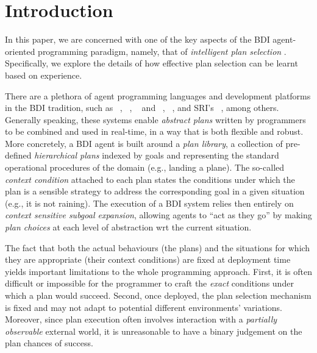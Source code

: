\section{Introduction}\label{sec:intro}

In this paper, we are concerned with one of the key aspects of the BDI
agent-oriented programming paradigm, namely, that of \emph{intelligent plan
selection} \cite{Pollack92-IRMA,Georgeff89-PRS}.
Specifically, we explore the details of how effective plan selection can be
learnt based on experience.


There are a plethora of agent programming languages and development platforms in
the BDI tradition, such as  \PRS\ \cite{Georgeff89-PRS}, \JACK~\cite{BRHL98},
\TAPL~\cite{Hindriks99:Agent} and \DAPL~\cite{Dastani:JAAMAS08-2APL},
\JASON~\cite{jasonbook}, and SRI's \SPARK~\cite{MorelyM:AAMAS04-SPARK}, among
others. %
Generally speaking, these systems enable \emph{abstract plans} written by
programmers to be combined and used in real-time, in a way that is both flexible
and robust. More concretely, a BDI agent is built around a
\textit{plan library}, a collection of pre-defined \textit{hierarchical plans}
indexed by goals and representing the standard operational procedures of the
domain (e.g., landing a plane).
The so-called \emph{context condition} attached to each plan states the
conditions under which the plan is a sensible strategy to address the
corresponding goal in a given situation (e.g., it is not raining). The execution
of a BDI system relies then entirely on \textit{context sensitive subgoal
expansion}, allowing agents to ``act as they go'' by making \emph{plan
choices} at each level of abstraction wrt the current situation.



The fact that both the actual behaviours (the plans) and the situations for which
they are appropriate (their context conditions) are fixed at deployment time
yields important limitations to the whole programming approach.
First, it is often difficult or impossible for the programmer to craft the
\emph{exact} conditions under which a plan would succeed. Second, once deployed,
the plan selection mechanism is fixed and may not adapt to potential different
environments' variations.
Moreover, since plan execution often involves interaction with a \emph{partially
observable} external world, it is unreasonable to have a binary judgement on the
plan chances of success.


